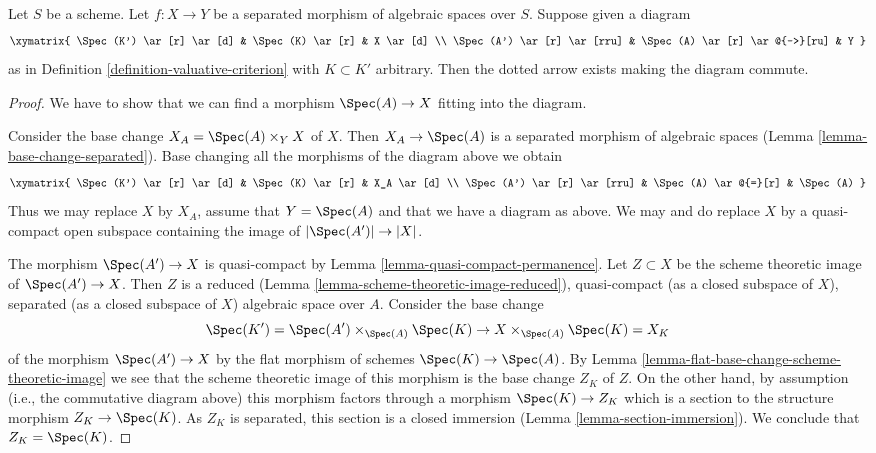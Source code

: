 \begin{lemma}
\label{lemma-push-down-solution}
Let $S$ be a scheme. Let $f : X \to Y$ be a separated morphism of
algebraic spaces over $S$. Suppose given a diagram
$$
\xymatrix{
\Spec(K') \ar[r] \ar[d] & \Spec(K) \ar[r] & X \ar[d] \\
\Spec(A') \ar[r] \ar[rru] & \Spec(A) \ar[r] \ar@{-->}[ru] & Y
}
$$
as in Definition \ref{definition-valuative-criterion} with $K \subset K'$
arbitrary. Then the dotted arrow exists making the diagram commute.
\end{lemma}

\begin{proof}
We have to show that we can find a morphism $\Spec(A) \to X$ fitting
into the diagram.

\medskip\noindent
Consider the base change $X_A = \Spec(A) \times_Y X$ of $X$.
Then $X_A \to \Spec(A)$ is a separated morphism of algebraic
spaces (Lemma \ref{lemma-base-change-separated}). Base changing
all the morphisms of the diagram above we obtain
$$
\xymatrix{
\Spec(K') \ar[r] \ar[d] & \Spec(K) \ar[r] & X_A \ar[d] \\
\Spec(A') \ar[r] \ar[rru] & \Spec(A) \ar@{=}[r] & \Spec(A)
}
$$
Thus we may replace $X$ by $X_A$, assume that $Y = \Spec(A)$ and
that we have a diagram as above. We may and do replace $X$ by
a quasi-compact open subspace containing the image of $|\Spec(A')| \to |X|$.

\medskip\noindent
The morphism $\Spec(A') \to X$ is quasi-compact by
Lemma \ref{lemma-quasi-compact-permanence}.
Let $Z \subset X$ be the scheme theoretic image of
$\Spec(A') \to X$. Then $Z$ is a reduced
(Lemma \ref{lemma-scheme-theoretic-image-reduced}),
quasi-compact (as a closed subspace of $X$), separated
(as a closed subspace of $X$) algebraic space over $A$.
Consider the base change
$$
\Spec(K') = \Spec(A') \times_{\Spec(A)} \Spec(K) \to
X \times_{\Spec(A)} \Spec(K) = X_K
$$
of the morphism $\Spec(A') \to X$ by the flat morphism of schemes
$\Spec(K) \to \Spec(A)$. By
Lemma \ref{lemma-flat-base-change-scheme-theoretic-image}
we see that the scheme theoretic image of this morphism
is the base change $Z_K$ of $Z$. On the other hand, by
assumption (i.e., the commutative diagram above)
this morphism factors through a morphism
$\Spec(K) \to Z_K$ which is a section to the structure morphism
$Z_K \to \Spec(K)$. As $Z_K$ is separated, this section is a
closed immersion (Lemma \ref{lemma-section-immersion}).
We conclude that $Z_K = \Spec(K)$.


\end{proof}
